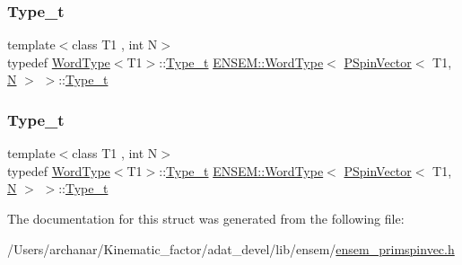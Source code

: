 \subsubsection{\texorpdfstring{Type\_t}{Type\_t}\hspace{0.1cm}{\footnotesize\ttfamily [1/2]}}
{\footnotesize\ttfamily template$<$class T1 , int N$>$ \\
typedef \mbox{\hyperlink{structENSEM_1_1WordType}{Word\+Type}}$<$T1$>$\+::\mbox{\hyperlink{structENSEM_1_1WordType_3_01PSpinVector_3_01T1_00_01N_01_4_01_4_addbb91e7d2c1c1c79f012acf1cd02ce3}{Type\+\_\+t}} \mbox{\hyperlink{structENSEM_1_1WordType}{E\+N\+S\+E\+M\+::\+Word\+Type}}$<$ \mbox{\hyperlink{classENSEM_1_1PSpinVector}{P\+Spin\+Vector}}$<$ T1, \mbox{\hyperlink{operator__name__util_8cc_a7722c8ecbb62d99aee7ce68b1752f337}{N}} $>$ $>$\+::\mbox{\hyperlink{structENSEM_1_1WordType_3_01PSpinVector_3_01T1_00_01N_01_4_01_4_addbb91e7d2c1c1c79f012acf1cd02ce3}{Type\+\_\+t}}}

\mbox{\label{structENSEM_1_1WordType_3_01PSpinVector_3_01T1_00_01N_01_4_01_4_addbb91e7d2c1c1c79f012acf1cd02ce3}} 
\subsubsection{\texorpdfstring{Type\_t}{Type\_t}\hspace{0.1cm}{\footnotesize\ttfamily [2/2]}}
{\footnotesize\ttfamily template$<$class T1 , int N$>$ \\
typedef \mbox{\hyperlink{structENSEM_1_1WordType}{Word\+Type}}$<$T1$>$\+::\mbox{\hyperlink{structENSEM_1_1WordType_3_01PSpinVector_3_01T1_00_01N_01_4_01_4_addbb91e7d2c1c1c79f012acf1cd02ce3}{Type\+\_\+t}} \mbox{\hyperlink{structENSEM_1_1WordType}{E\+N\+S\+E\+M\+::\+Word\+Type}}$<$ \mbox{\hyperlink{classENSEM_1_1PSpinVector}{P\+Spin\+Vector}}$<$ T1, \mbox{\hyperlink{operator__name__util_8cc_a7722c8ecbb62d99aee7ce68b1752f337}{N}} $>$ $>$\+::\mbox{\hyperlink{structENSEM_1_1WordType_3_01PSpinVector_3_01T1_00_01N_01_4_01_4_addbb91e7d2c1c1c79f012acf1cd02ce3}{Type\+\_\+t}}}



The documentation for this struct was generated from the following file\+:\begin{DoxyCompactItemize}
\item 
/\+Users/archanar/\+Kinematic\+\_\+factor/adat\+\_\+devel/lib/ensem/\mbox{\hyperlink{lib_2ensem_2ensem__primspinvec_8h}{ensem\+\_\+primspinvec.\+h}}\end{DoxyCompactItemize}
